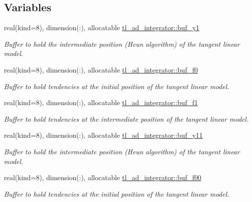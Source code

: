\subsection*{Variables}
\begin{DoxyCompactItemize}
\item 
real(kind=8), dimension(\+:), allocatable \hyperlink{namespacetl__ad__integrator_a54c26282330477995b554805fbacf236}{tl\+\_\+ad\+\_\+integrator\+::buf\+\_\+y1}
\begin{DoxyCompactList}\small\item\em Buffer to hold the intermediate position (Heun algorithm) of the tangent linear model. \end{DoxyCompactList}\item 
real(kind=8), dimension(\+:), allocatable \hyperlink{namespacetl__ad__integrator_ad0e2f29027e4317cae009ca0c4ad1b5a}{tl\+\_\+ad\+\_\+integrator\+::buf\+\_\+f0}
\begin{DoxyCompactList}\small\item\em Buffer to hold tendencies at the initial position of the tangent linear model. \end{DoxyCompactList}\item 
real(kind=8), dimension(\+:), allocatable \hyperlink{namespacetl__ad__integrator_ac466cd6f698dc9fed5fc3ab46f30b9a5}{tl\+\_\+ad\+\_\+integrator\+::buf\+\_\+f1}
\begin{DoxyCompactList}\small\item\em Buffer to hold tendencies at the intermediate position of the tangent linear model. \end{DoxyCompactList}\item 
real(kind=8), dimension(\+:), allocatable \hyperlink{namespacetl__ad__integrator_ae17c25e2843c5f18b69c133ccca1d483}{tl\+\_\+ad\+\_\+integrator\+::buf\+\_\+y11}
\begin{DoxyCompactList}\small\item\em Buffer to hold the intermediate position (Heun algorithm) of the tangent linear model. \end{DoxyCompactList}\item 
real(kind=8), dimension(\+:), allocatable \hyperlink{namespacetl__ad__integrator_ac1d8e51e7ef84e4b5cbab851759fa983}{tl\+\_\+ad\+\_\+integrator\+::buf\+\_\+f00}
\begin{DoxyCompactList}\small\item\em Buffer to hold tendencies at the initial position of the tangent linear model. \end{DoxyCompactList}\item 

\end{DoxyCompactItemize}
